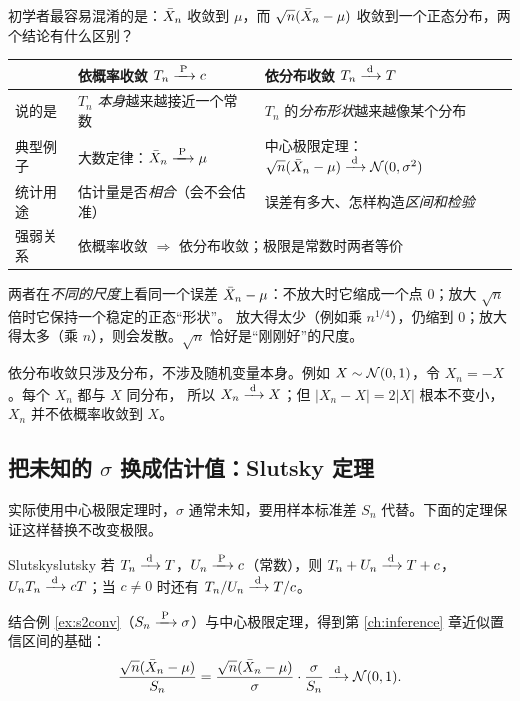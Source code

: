 初学者最容易混淆的是：$\bar{X}_n$ 收敛到 $\mu$，而 $\sqrt n(\bar{X}_n-\mu)$ 收敛到一个正态分布，两个结论有什么区别？

\begin{table}[H]
\centering\small
\begin{tabularx}{\linewidth}{l X X}
\toprule
 & 依概率收敛 $T_n\xrightarrow{\;\mathrm{P}\;} c$ & 依分布收敛 $T_n\xrightarrow{\;\mathrm{d}\;} T$ \\
\midrule
说的是 & $T_n$ \emph{本身}越来越接近一个常数 & $T_n$ 的\emph{分布形状}越来越像某个分布 \\
典型例子 & 大数定律：$\bar{X}_n\xrightarrow{\;\mathrm{P}\;}\mu$ & 中心极限定理：$\sqrt n(\bar{X}_n-\mu)\xrightarrow{\;\mathrm{d}\;}\mathcal{N}(0,\sigma^2)$ \\
统计用途 & 估计量是否\emph{相合}（会不会估准） & 误差有多大、怎样构造\emph{区间和检验} \\
强弱关系 & \multicolumn{2}{l}{依概率收敛 $\Rightarrow$ 依分布收敛；极限是常数时两者等价} \\
\bottomrule
\end{tabularx}
\end{table}

两者在\emph{不同的尺度}上看同一个误差 $\bar{X}_n-\mu$：不放大时它缩成一个点 $0$；放大 $\sqrt n$ 倍时它保持一个稳定的正态“形状”。
放大得太少（例如乘 $n^{1/4}$），仍缩到 $0$；放大得太多（乘 $n$），则会发散。$\sqrt n$ 恰好是“刚刚好”的尺度。

\begin{warning}
依分布收敛只涉及分布，不涉及随机变量本身。例如 $X\sim\mathcal{N}(0,1)$，令 $X_n=-X$。每个 $X_n$ 都与 $X$ 同分布，
所以 $X_n\xrightarrow{\;\mathrm{d}\;} X$；但 $|X_n-X|=2|X|$ 根本不变小，$X_n$ 并不依概率收敛到 $X$。
\end{warning}

\subsection{把未知的 \texorpdfstring{$\sigma$}{σ} 换成估计值：Slutsky 定理}

实际使用中心极限定理时，$\sigma$ 通常未知，要用样本标准差 $S_n$ 代替。下面的定理保证这样替换不改变极限。

\begin{theorem}{Slutsky}{slutsky}
若 $T_n\xrightarrow{\;\mathrm{d}\;} T$，$U_n\xrightarrow{\;\mathrm{P}\;} c$（常数），则
$T_n+U_n\xrightarrow{\;\mathrm{d}\;} T+c$，$U_nT_n\xrightarrow{\;\mathrm{d}\;} cT$；当 $c\ne0$ 时还有 $T_n/U_n\xrightarrow{\;\mathrm{d}\;} T/c$。
\end{theorem}

\noindent 结合例 \ref{ex:s2conv}（$S_n\xrightarrow{\;\mathrm{P}\;}\sigma$）与中心极限定理，得到第 \ref{ch:inference} 章近似置信区间的基础：
\begin{equation}\label{eq:studentized}
\frac{\sqrt n(\bar{X}_n-\mu)}{S_n}=\frac{\sqrt n(\bar{X}_n-\mu)}{\sigma}\cdot\frac{\sigma}{S_n}\xrightarrow{\;\mathrm{d}\;}\mathcal{N}(0,1).
\end{equation}

